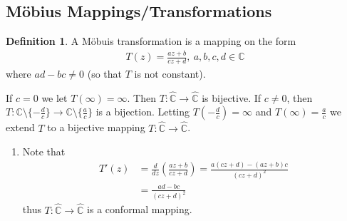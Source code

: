\documentclass[12pt, a4paper]{article}
\theoremstyle{plain}
\theoremstyle{definition}
\newtheorem{definition}{Definition} %
\begin{document}
		\subsection{Möbius Mappings/Transformations} %
		\label{sub:möbius_mappings_transformations}
			\begin{definition}
				A Möbuis transformation is a mapping on the form
				\begin{align*}
					T(z) = \frac{az+b}{cz+d},\:a,b,c,d\in \mathbb{C}
				\end{align*}
				where $ad-bc\not=0$ (so that $T$ is not constant).

				If $c=0$ we let $T(\infty)= \infty$. Then $T:\hat{\mathbb{C}}\to \hat{\mathbb{C}}$ is bijective. If $c\not=0$, then $T:\mathbb{C}\setminus\{-\frac{d}{c}\}\to \mathbb{C}\setminus\{\frac{a}{c}\}$ is a bijection. Letting $T(- \frac{d}{c}) = \infty$ and $T(\infty) = \frac{a}{c}$ we extend $T$ to a bijective mapping $T:\hat{\mathbb{C}}\to\hat{\mathbb{C}}$.

				\begin{enumerate}
					\item Note that
						\begin{align*}
							T'(z) &= 
							\frac{d}{dz}\left(\frac{az+b}{cz+d}\right) = 
							\frac{a(cz+d)-(az+b)c}{(cz+d)^2}\\ &=
							\frac{ad-bc}{(cz+d)^2}
						\end{align*}
						thus $T:\hat{\mathbb{C}}\to\hat{\mathbb{C}}$ is a conformal mapping.


\end{enumerate}
\end{definition}
\end{document}
